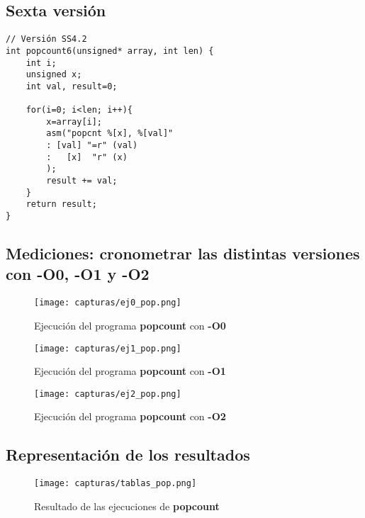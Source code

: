 \subsection{Sexta versión}
\begin{lstlisting}
// Versión SS4.2
int popcount6(unsigned* array, int len) {
	int i;
	unsigned x;
	int val, result=0;
	
	for(i=0; i<len; i++){
		x=array[i];
		asm("popcnt %[x], %[val]"
		: [val] "=r" (val)
		:   [x]  "r" (x)
		);
		result += val;
	}
	return result;
}
\end{lstlisting}

\newpage

\subsection{Mediciones:	cronometrar las	distintas versiones con	-O0, -O1 y -O2}



\begin{figure}[H] %
	\centering
	\texttt{[image: capturas/ej0\_pop.png]} 
	\caption{Ejecución del programa \textbf{popcount} con \textbf{-O0}} 
	\label{fig:figura2}
\end{figure}

\begin{figure}[H] %
	\centering
	\texttt{[image: capturas/ej1\_pop.png]} 
	\caption{Ejecución del programa \textbf{popcount} con \textbf{-O1}} 
	\label{fig:figura3}
\end{figure}

\begin{figure}[H] %
	\centering
	\texttt{[image: capturas/ej2\_pop.png]} 
	\caption{Ejecución del programa \textbf{popcount} con \textbf{-O2}} 
	\label{fig:figura4}
\end{figure}

\newpage

\subsection{Representación de los resultados}
\begin{figure}[H] %
	\centering
	\texttt{[image: capturas/tablas\_pop.png]} 
	\caption{Resultado de las ejecuciones de \textbf{popcount}} 
	\label{fig:figura5}
\end{figure}

